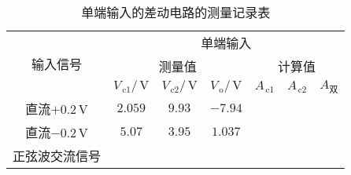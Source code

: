 \documentclass{ctexart}
\renewcommand{\rm}{\,\mathrm}
\begin{document}
    \begin{table}[htbp]
    	\centering
    	\caption{单端输入的差动电路的测量记录表}
    	\begin{tabular}{rrrrrrr}
    		\hline
    		\multicolumn{1}{|c|}{\multirow{3}{*}{输入信号}} & \multicolumn{6}{c|}{单端输入} \\
    		\cline{2-7}    \multicolumn{1}{|c|}{} & \multicolumn{3}{c|}{测量值} & \multicolumn{3}{c|}{计算值} \\
    		\cline{2-7}    \multicolumn{1}{|c|}{} & \multicolumn{1}{c|}{$V_{\rm{c}1}/\rm{V}$} & \multicolumn{1}{c|}{$V_{\rm{c}2}/\rm{V}$} & \multicolumn{1}{c|}{$V_{\rm{o}}/\rm{V}$} & \multicolumn{1}{c|}{$A_{\rm{c}1}$} & \multicolumn{1}{c|}{$A_{\rm{c}2}$} & \multicolumn{1}{c|}{$A_{\text{双}}$} \\
    		\hline
    		\multicolumn{1}{|c|}{直流$+0.2\rm{V}$} & \multicolumn{1}{c|}{$2.059$} & \multicolumn{1}{c|}{$9.93$} & \multicolumn{1}{c|}{$-7.94$} & \multicolumn{1}{c|}{} & \multicolumn{1}{c|}{} & \multicolumn{1}{c|}{} \\
    		\hline
    		\multicolumn{1}{|c|}{直流$-0.2\rm{V}$} & \multicolumn{1}{c|}{$5.07$} & \multicolumn{1}{c|}{$3.95$} & \multicolumn{1}{c|}{$1.037$} & \multicolumn{1}{r|}{} & \multicolumn{1}{r|}{} & \multicolumn{1}{r|}{} \\
    		\hline
    		\multicolumn{1}{|c|}{正弦波交流信号} & \multicolumn{1}{r|}{} & \multicolumn{1}{r|}{} & \multicolumn{1}{r|}{} & \multicolumn{1}{r|}{} & \multicolumn{1}{r|}{} & \multicolumn{1}{r|}{} \\
    		\hline
    	\end{tabular}%
    \end{table}%
\end{document}

